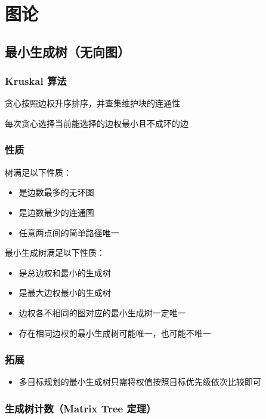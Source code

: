 

\section{图论}

\subsection{最小生成树（无向图）}

\subsubsection{Kruskal 算法}

贪心按照边权升序排序，并查集维护块的连通性

每次贪心选择当前能选择的边权最小且不成环的边

\subsubsection{性质}

树满足以下性质：

\begin{itemize}
    \item 是边数最多的无环图
    \item 是边数最少的连通图
    \item 任意两点间的简单路径唯一
\end{itemize}

最小生成树满足以下性质：

\begin{itemize}
    \item 是总边权和最小的生成树
    \item 是最大边权最小的生成树
    \item 边权各不相同的图对应的最小生成树一定唯一
    \item 存在相同边权的最小生成树可能唯一，也可能不唯一
\end{itemize}

\subsubsection{拓展}

\begin{itemize}
    \item 多目标规划的最小生成树只需将权值按照目标优先级依次比较即可
\end{itemize}

\subsubsection{生成树计数（Matrix Tree 定理）}

